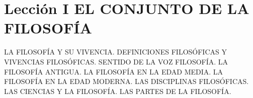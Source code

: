 \documentclass[10pt,letterpaper]{book}
\author{Manuel García Morente}
\begin{document}
\chapter*{Lecci\'{o}n I EL CONJUNTO DE LA FILOSOF\'{I}A}
LA FILOSOFÍA Y SU VIVENCIA. DEFINICIONES FILOSÓFICAS Y VIVENCIAS FILOSÓFICAS. SENTIDO DE LA VOZ FILOSOFÍA. LA FILOSOFÍA ANTIGUA. LA FILOSOFÍA EN LA EDAD ME­DIA. LA FILOSOFÍA EN LA EDAD MODERNA. LAS DISCIPLI­NAS FILOSÓFICAS. LAS CIENCIAS Y LA FILOSOFÍA. LAS PAR­TES DE LA FILOSOFÍA.
\end{document}
